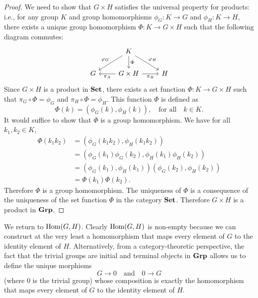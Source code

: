 \begin{proof}
    We need to show that \(G \times H\) satisfies the universal property for
    products: i.e., for any group \(K\) and group homomorphisms \(\phi_G: K \to
    G\) and \(\phi_H: K \to H\), there exists a unique group homomorphism
    \(\Phi: K \to G \times H\) such that the following diagram commutes:
    \[
        \begin{tikzcd}
            & K \arrow[ld, "\phi_G"'] \arrow[rd, "\phi_H"] \arrow[d, "\Phi"] &   \\
            G & G \times H \arrow[r, "\pi_B"'] \arrow[l, "\pi_A"]     & H
        \end{tikzcd}
    \]
    Since \(G \times H\) is a product in \(\mathbf{Set}\), there exists a set function
    \(\Phi: K \to G \times H\) such that \(\pi_G \circ \Phi = \phi_G\) and
    \(\pi_H \circ \Phi = \phi_H\). This function \(\Phi\) is defined as
    \[
        \Phi(k) = (\phi_G(k), \phi_H(k)), \quad \text{for all} \quad k \in K.
    \]
    It would suffice to show that \(\Phi\) is a group homomorphism. We have for
    all \(k_1, k_2 \in K\),
    \begin{align*}
        \Phi(k_1k_2) & = (\phi_G(k_1k_2), \phi_H(k_1k_2))\\
        & = (\phi_G(k_1)\phi_G(k_2), \phi_H(k_1)\phi_H(k_2))\\
        & = (\phi_G(k_1), \phi_H(k_1))(\phi_G(k_2), \phi_H(k_2))\\
        & = \Phi(k_1)\Phi(k_2).
    \end{align*}
    Therefore \(\Phi\) is a group homomorphism. The uniqueness of \(\Phi\) is a
    consequence of the uniqueness of the set function \(\Phi\) in the category
    \(\mathbf{Set}\). Therefore \(G \times H\) is a product in \(\mathbf{Grp}\).
\end{proof}


\begin{example}
    We return to \(\operatorname{Hom}(G, H)\). Clearly \(\operatorname{Hom}(G, H)\) is non-empty because we
    can construct at the very least a homomorphism that maps every element of
    \(G\) to the identity element of \(H\). Alternatively, from a
    category-theoretic perspective, the fact that the trivial groups are initial
    and terminal objects in \(\mathbf{Grp}\) allows us to define the unique morphisms
    \[
        G \to 0 \quad \text{and} \quad 0 \to G
    \]
    (where \(0\) is the trivial group) whose composition is exactly the
    homomorphism that maps every element of \(G\) to the identity element of
    \(H\).
\end{example}

